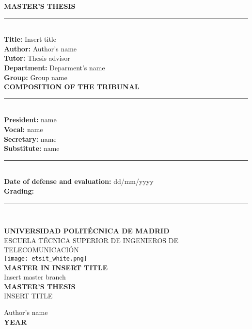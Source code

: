 \noindent\hspace*{\centeroffset}\begin{minipage}{\textwidth}
\large{\textbf{MASTER'S THESIS}}\\
\noindent\rule[-1ex]{\textwidth}{2pt}\\[2.5ex]

\textbf{Title:} {Insert title}\\[0.2cm]
\textbf{Author:} {Author's name}\\[0.2cm]
\textbf{Tutor:}  {Thesis advisor   }\\[0.2cm]
\textbf{Department:} {Deparment's name}\\
\textbf{Group:} {Group name}\\

\vspace{0.7cm}
\large{\textbf{COMPOSITION OF THE TRIBUNAL}}\\
\noindent\rule[-1ex]{\textwidth}{2pt}\\[2.5ex]

\textbf{President:} {name}\\[0.2cm]
\textbf{Vocal:} {name}\\[0.2cm]
\textbf{Secretary:}  {name}\\[0.2cm]
\textbf{Substitute:} {name}\\

\vspace{0.7cm}
\noindent\rule[-1ex]{\textwidth}{2pt}\\[2.5ex]

\textbf{Date of defense and evaluation:} {dd/mm/yyyy}\\[0.2cm]
\textbf{Grading:} \\

\noindent\rule[-1ex]{\textwidth}{2pt}\\[2.5ex]

\end{minipage}
\newpage

	

\thispagestyle{empty}


\noindent\hspace*{\centeroffset}\begin{minipage}{\textwidth}
	

	\centering
	\LARGE{\textbf{UNIVERSIDAD POLITÉCNICA DE MADRID}}\\[0.7cm]
	\Large{ESCUELA TÉCNICA SUPERIOR DE INGENIEROS DE TELECOMUNICACIÓN}\\[0.7cm]
	\texttt{[image: etsit\_white.png]}\\[1cm]
	\LARGE{\textbf{MASTER IN INSERT TITLE}}\\
	\large{Insert master branch}\\[4.7cm]
	
	\LARGE{\textbf{MASTER'S THESIS}\\[2cm]}
	\LARGE{INSERT TITLE}\\
	
\end{minipage}

\vspace{2.6cm}
\noindent\hspace*{\centeroffset}\begin{minipage}{\textwidth}
	\centering
	
	\Large{Author's name}\\[2ex]
	\Large{\textbf{YEAR}}
\end{minipage}

